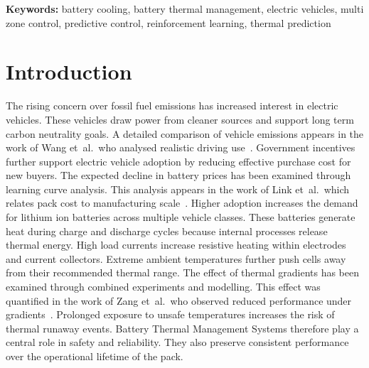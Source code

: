 \documentclass{article}
\begin{document}
\begin{abstract}
The architecture contains spatial perception, temporal encoding, and a contextual branch forming a three stage module. A predictive encoder models heat propagation under real conditions. An actor critic controller converts predictions into coordinated thermal actions.

The framework lowers peak temperature, improves spatial uniformity, and reduces auxiliary energy use. Its graph based design scales to large packs with complex internal layouts. The central novelty lies in uniting predictive modelling with multi zone reinforcement learning. This union yields a proactive controller that shapes thermal behaviour before unsafe states arise..
\end{abstract}

\noindent\textbf{Keywords:} battery cooling, battery thermal management, electric vehicles, multi zone control, predictive control, reinforcement learning, thermal prediction
\clearpage
\twocolumn


\section{Introduction}

The rising concern over fossil fuel emissions has increased interest in electric vehicles.
These vehicles draw power from cleaner sources and support long term carbon neutrality goals.
A detailed comparison of vehicle emissions appears in the work of Wang et~al.\ who analysed realistic driving use~\cite{LCA_EV2023}.
Government incentives further support electric vehicle adoption by reducing effective purchase cost for new buyers.
The expected decline in battery prices has been examined through learning curve analysis.
This analysis appears in the work of Link et~al.\ which relates pack cost to manufacturing scale~\cite{Link2024}.
Higher adoption increases the demand for lithium ion batteries across multiple vehicle classes.
These batteries generate heat during charge and discharge cycles because internal processes release thermal energy.
High load currents increase resistive heating within electrodes and current collectors.
Extreme ambient temperatures further push cells away from their recommended thermal range.
The effect of thermal gradients has been examined through combined experiments and modelling.
This effect was quantified in the work of Zang et~al.\ who observed reduced performance under gradients~\cite{ThermalGradients2023}.
Prolonged exposure to unsafe temperatures increases the risk of thermal runaway events.
Battery Thermal Management Systems therefore play a central role in safety and reliability.
They also preserve consistent performance over the operational lifetime of the pack.
\end{document}

